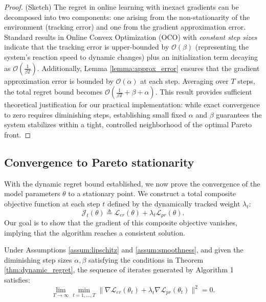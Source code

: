 \begin{proof}
(Sketch) The regret in online learning with inexact gradients can be decomposed into two components: one arising from the non-stationarity of the environment (tracking error) and one from the gradient approximation error.
Standard results in Online Convex Optimization (OCO) with \textit{constant step sizes} indicate that the tracking error is upper-bounded by $\mathcal{O}(\beta)$ (representing the system's reaction speed to dynamic changes) plus an initialization term decaying as $\mathcal{O}(\frac{1}{\beta T})$.
Additionally, Lemma \ref{lemma:approx_error} ensures that the gradient approximation error is bounded by $\mathcal{O}(\alpha)$ at each step.
Averaging over $T$ steps, the total regret bound becomes $\mathcal{O}(\frac{1}{\beta T} + \beta + \alpha)$.
This result provides sufficient theoretical justification for our practical implementation: while exact convergence to zero requires diminishing steps, establishing small fixed $\alpha$ and $\beta$ guarantees the system stabilizes within a tight, controlled neighborhood of the optimal Pareto front.
\end{proof}

\subsection{Convergence to Pareto stationarity}
With the dynamic regret bound established, we now prove the convergence of the model parameters $\theta$ to a stationary point. We construct a total composite objective function at each step $t$ defined by the dynamically tracked weight $\lambda_t$:
\begin{equation}
    \mathcal{J}_t(\theta) \triangleq \mathcal{L}_{er}(\theta) + \lambda_t \mathcal{L}_{pr}(\theta).
\end{equation}
Our goal is to show that the gradient of this composite objective vanishes, implying that the algorithm reaches a consistent solution.

\begin{theorem}
\label{thm:stationarity}
Under Assumptions \ref{assum:lipschitz} and \ref{assum:smoothness}, and given the diminishing step sizes $\alpha, \beta$ satisfying the conditions in Theorem \ref{thm:dynamic_regret}, the sequence of iterates generated by Algorithm 1 satisfies:
\begin{equation}
    \lim_{T \to \infty} \min_{t=1,\dots,T} \|\nabla \mathcal{L}_{er}(\theta_t) + \lambda_t \nabla \mathcal{L}_{pr}(\theta_t) \|^2 = 0.
\end{equation}
\end{theorem}

